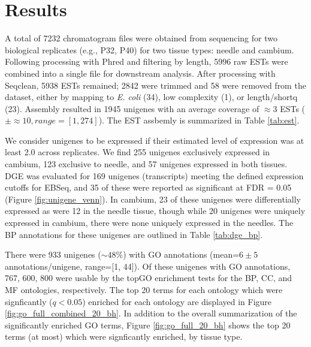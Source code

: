 \documentclass[11pt]{article}
\begin{document}
\section*{Results}

A total of 7232 chromatogram files were obtained from sequencing for two
biological replicates (e.g., P32, P40) for two tissue types: needle and cambium.
Following processing with Phred and filtering by length, 5996 raw ESTs were
combined into a single file for downstream analysis.  After processing with
Seqclean, 5938 ESTs remained; 2842 were trimmed and 58 were removed from the
dataset, either by mapping to \textit{E. coli} (34), low complexity (1), or
length/shortq (23). Assembly resulted in 1945 unigenes with an average coverage
of $\approx{3}$ ESTs ($\pm \approx{10}, range=[1,274]$). The EST assbemly  is
summarized in Table \ref{tab:est}.

We consider unigenes to be expressed if their estimated level of expression was
at least 2.0 across replicates.  We find 255 unigenes exclusively expressed in
cambium, 123 exclusive to needle, and 57 unigenes expressed in both tissues. DGE
was evaluated for 169 unigenes (transcripts) meeting the defined expression
cutoffs for EBSeq, and 35 of these were reported as significant at FDR = 0.05
(Figure \ref{fig:unigene_venn}).  In cambium, 23 of these unigenes were
differentially expressed as were 12 in the needle tissue, though while 20
unigenes were uniquely expressed in cambium, there were none uniquely expressed
in the needles.  The BP annotations for these unigenes are outlined in Table
\ref{tab:dge_bp}.

There were 933 unigenes ($\sim 48\%$) with GO annotations (mean=$6 \pm
5$ annotations/unigene, range=[1, 44]). Of these unigenes with GO
annotations, 767, 600, 800 were usable by the topGO enrichment tests
for the BP, CC, and MF ontologies, respectively.  The top 20 terms for
each ontology which were signficantly ($q < 0.05$) enriched for each
ontology are displayed in Figure \ref{fig:go_full_combined_20_bh}.  In
addition to the overall summarization of the significantly enriched GO
terms, Figure \ref{fig:go_full_20_bh} shows the top 20 terms (at most) 
which were signficantly enriched, by tissue type.



\end{document}

